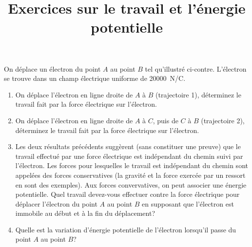 \documentclass{tufte-handout}
\title{Exercices sur le travail et l'énergie potentielle}
\date{}
\begin{document}
\maketitle

On déplace un électron du point $A$ au point $B$ tel qu'illustré ci-contre.
L'électron se trouve dans un champ électrique uniforme de \SI{20000}{N/C}.

\begin{marginfigure}
\end{marginfigure}

\begin{enumerate}
  \item On déplace l'électron en ligne droite de $A$ à $B$ (trajectoire 1),
    déterminez le travail fait par la force électrique sur l'électron.


  \item On déplace l'électron en ligne droite de $A$ à $C$, puis de $C$ à
    $B$ (trajectoire 2), déterminez le travail fait par la force électrique sur
    l'électron.

  \item Les deux résultats précédents suggèrent (sans constituer une preuve)
    que le travail effectué par une force électrique est indépendant du
    chemin suivi par l'électron. Les forces pour lesquelles le travail est
    indépendant du chemin sont appelées des forces conservatives (la gravité et
    la force exercée par un ressort en sont des exemples). Aux forces
    convervatives, on peut associer une énergie potentielle.
    Quel travail devez-vous effectuer contre la force électrique pour déplacer
    l'électron du point $A$ au point $B$ en supposant que l'électron est
    immobile au début et à la fin du déplacement?

  \item Quelle est la variation d'énergie potentielle de l'électron lorsqu'il
    passe du point $A$ au point $B$?
\end{enumerate}
\end{document}
